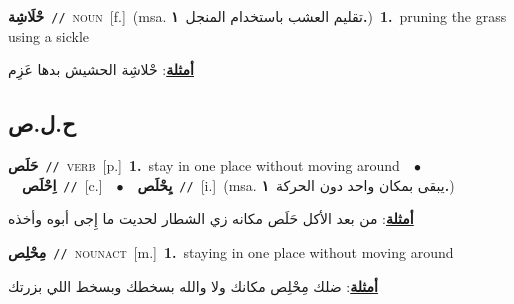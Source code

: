\documentclass[10pt,a4paper,twoside]{article} %
\begin{document}
\begin{multicols}{2}
{\setlength\topsep{0pt}\textbf{\foreignlanguage{arabic}{حْلَاشِة}}\ {\color{gray}\texttt{//}\color{black}}\ \textsc{noun}\ [f.]\ \color{gray}(msa. \foreignlanguage{arabic}{تقليم العشب باستخدام المنجل}~\foreignlanguage{arabic}{\textbf{١.}})\color{black}\ \textbf{1.}~pruning the grass using a sickle\  \begin{flushright}\color{gray}\foreignlanguage{arabic}{\textbf{\underline{\foreignlanguage{arabic}{أمثلة}}}: حْلاشِة الحشيش بدها عَزِم}\end{flushright}\color{black}} \vspace{2mm}

\vspace{-3mm}
\subsection*{\color{blue}\foreignlanguage{arabic}{ح.ل.ص}\color{blue}{}} 

{\setlength\topsep{0pt}\textbf{\foreignlanguage{arabic}{حَلَص}}\ {\color{gray}\texttt{//}\color{black}}\ \textsc{verb}\ [p.]\ \textbf{1.}~stay in one place without moving around\ \ $\bullet$\ \ \setlength\topsep{0pt}\textbf{\foreignlanguage{arabic}{اِحْلَص}}\ {\color{gray}\texttt{//}\color{black}}\ [c.]\ \ $\bullet$\ \ \setlength\topsep{0pt}\textbf{\foreignlanguage{arabic}{يِحْلَص}}\ {\color{gray}\texttt{//}\color{black}}\ [i.]\ \color{gray}(msa. \foreignlanguage{arabic}{يبقى بمكان واحد دون الحركة}~\foreignlanguage{arabic}{\textbf{١.}})\color{black}\  \begin{flushright}\color{gray}\foreignlanguage{arabic}{\textbf{\underline{\foreignlanguage{arabic}{أمثلة}}}: من بعد الأكل حَلَص مكانه زي الشطار لحديت ما إِجى أبوه وأخذه}\end{flushright}\color{black}} \vspace{2mm}

{\setlength\topsep{0pt}\textbf{\foreignlanguage{arabic}{مِحْلِص}}\ {\color{gray}\texttt{//}\color{black}}\ \textsc{noun\textunderscore act}\ [m.]\ \textbf{1.}~staying in one place without moving around\  \begin{flushright}\color{gray}\foreignlanguage{arabic}{\textbf{\underline{\foreignlanguage{arabic}{أمثلة}}}: ضلك مِحْلِص مكانك ولا والله بسخطك وبسخط اللي بزرتك}\end{flushright}\color{black}} \vspace{2mm}


\end{multicols}
\end{document}
